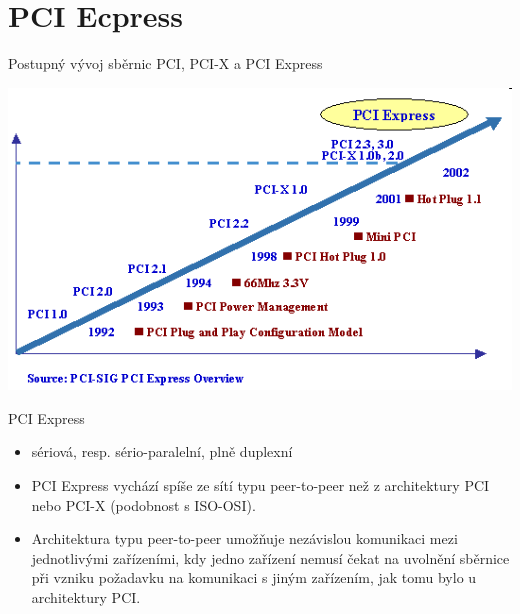 \documentclass[aspectratio=43]{beamer}
\begin{document}
\section{PCI Ecpress}
\begin{frame}{Postupný vývoj sběrnic PCI, PCI-X a PCI Express}
	
	\begin{center}
		\includegraphics[width=1\linewidth]{extrahovane_obrazky/img_2_page1_0.png}
	\end{center}
\end{frame}


\begin{frame}{PCI Express}
	\begin{itemize}
		\item sériová, resp. sério-paralelní, plně duplexní
		\item PCI Express vychází spíše ze sítí typu peer-to-peer než z architektury PCI nebo PCI-X (podobnost s ISO-OSI).
		\item Architektura typu peer-to-peer umožňuje nezávislou komunikaci mezi jednotlivými zařízeními, kdy jedno zařízení nemusí čekat na uvolnění sběrnice při vzniku požadavku na komunikaci s jiným zařízením, jak tomu bylo u architektury PCI.
	\end{itemize}
	
\end{frame}
\end{document}
